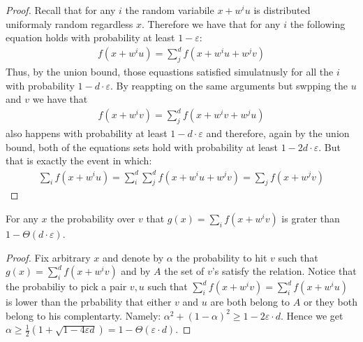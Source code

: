 \begin{proof}
  Recall that for any $i$ the random variabile $x + w^{i}u$ is distributed uniformaly random regardless $x$. Therefore we have that for any $i$ the following equation holds with probability at least $1 -\varepsilon$:      
  \begin{equation*}
    \begin{split}
    f\left( x + w^{i}u \right) = \sum_{j}^{d}{f\left( x +w^{i}u + w^{j}v \right)} 
    \end{split}
  \end{equation*}
  Thus, by the union bound, those equastions satisfied simulatnusly for all the $i$ with probability $1 - d\cdot \varepsilon$. By reappting on the same arguments but swpping the $u$ and $v$ we have that 
\begin{equation*}
    \begin{split}
    f\left( x + w^{i}v \right) = \sum_{j}^{d}{f\left( x +w^{i}v + w^{j}u \right)} 
    \end{split}
  \end{equation*}
also happens with probability at least $1- d\cdot\varepsilon$ and therefore, again by the union bound, both of the equations sets hold with probability at least $1 - 2d\cdot\varepsilon$. But that is exactly the event in which: 
\begin{equation*}
  \begin{split} 
    \sum_{i}{f\left( x + w^{i}u \right)} = \sum_{i}^{d}\sum^{d}_{j}{f\left( x +w^{i}u + w^{j}v \right)} =  \sum_{j}{f\left( x + w^{j}v \right)}
  \end{split}
\end{equation*}
\end{proof}
\begin{claim}
  \label{claim:fixx}
  For any $x$ the probability over $v$ that $g\left( x \right) = \sum_{i}{f(x + w^{i}v)}$ is grater than $ 1 - \Theta\left( d \cdot \varepsilon  \right)$. 
\end{claim}
\begin{proof}
  Fix arbitrary $x$ and denote by $\alpha$ the probability to hit $v$ such that $g(x) = \sum_{i}^{d}{f\left( x + w^{i}v \right)}$ and by $A$ the set of $v$'s satisfy the relation. Notice that the probabiliy to pick a pair $v,u$ such that $ \sum_{i}^{d}{f\left( x + w^{i}v \right)} = \sum_{i}^{d}{f\left( x + w^{i}u \right)}$ is lower than the prbability that either $v$ and $u$ are both belong to $A$ or they both belong to his complentarty. Namely: $ \alpha^{2} + (1-\alpha)^{2}\ge 1- 2 \varepsilon\cdot d$. Hence we get $\alpha \ge \frac{1}{2}\left( 1 + \sqrt{1 - 4\varepsilon d } \right) = 1 - \Theta\left( \varepsilon \cdot d \right)$.  
\end{proof}

